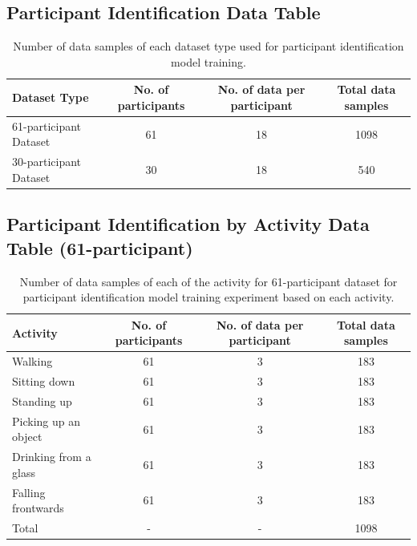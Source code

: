 \documentclass{l4proj}
\begin{document}
\begin{appendices}
\subsection{Participant Identification Data Table}
\begin{table}[h]
    \centering
    \begin{tabular}{|l|c|c|c|}
        \hline
        \rowcolor{lightgray}
        \textbf{Dataset Type} & \textbf{No. of participants} & \textbf{No. of data per participant} & \textbf{Total data samples}\\
        \hline
        61-participant Dataset & 61 & 18 & 1098\\
        \hline
        30-participant Dataset & 30 & 18 & 540\\
        \hline
    \end{tabular}
    \caption{Number of data samples of each dataset type used for participant identification model training.}
    \label{tab:participant-identification-number-of-samples}
\end{table}

\subsection{Participant Identification by Activity Data Table (61-participant)}
\begin{table}[h]
    \centering
    \begin{tabular}{|l|c|c|c|}
        \hline
        \rowcolor{lightgray}
        \textbf{Activity} & \textbf{No. of participants} & \textbf{No. of data per participant} & \textbf{Total data samples}\\
        \hline
        Walking & 61 & 3 & 183\\
        \hline
        Sitting down & 61 & 3 & 183\\
        \hline
        Standing up & 61 & 3 & 183\\
        \hline
        Picking up an object & 61 & 3 & 183\\
        \hline
        Drinking from a glass & 61 & 3 & 183\\
        \hline
        Falling frontwards & 61 & 3 & 183\\
        \hline
        Total & - & - & 1098\\
        \hline
    \end{tabular}
    \caption{Number of data samples of each of the activity for 61-participant dataset for participant identification model training experiment based on each activity.}
    \label{tab:participant-identification-by-activity}
\end{table}


\end{appendices}
\end{document}
